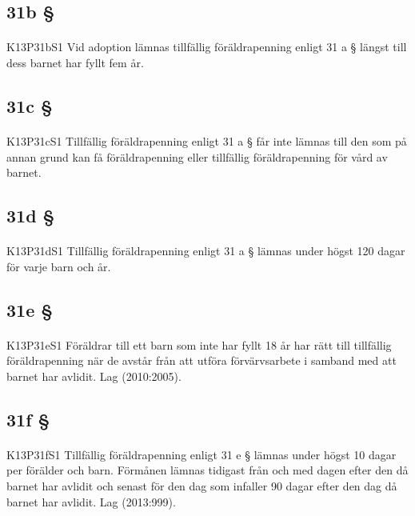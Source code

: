 \documentclass[a4paper,notitlepage,openany,10pt]{book}
\begin{document}
\subsection*{31b §}
\paragraph*{}
{\tiny K13P31bS1}
Vid adoption lämnas tillfällig föräldrapenning enligt 31 a § längst till dess barnet har fyllt fem år.
\subsection*{31c §}
\paragraph*{}
{\tiny K13P31cS1}
Tillfällig föräldrapenning enligt 31 a § får inte lämnas till den som på annan grund kan få föräldrapenning eller tillfällig föräldrapenning för vård av barnet.
\subsection*{31d §}
\paragraph*{}
{\tiny K13P31dS1}
Tillfällig föräldrapenning enligt 31 a § lämnas under högst 120 dagar för varje barn och år.
\subsection*{31e §}
\paragraph*{}
{\tiny K13P31eS1}
Föräldrar till ett barn som inte har fyllt 18 år har rätt till tillfällig föräldrapenning när de avstår från att utföra förvärvsarbete i samband med att barnet har avlidit.
Lag (2010:2005).
\subsection*{31f §}
\paragraph*{}
{\tiny K13P31fS1}
Tillfällig föräldrapenning enligt 31 e § lämnas under högst 10 dagar per förälder och barn. Förmånen lämnas tidigast från och med dagen efter den då barnet har avlidit och senast för den dag som infaller 90 dagar efter den dag då barnet har avlidit.
Lag (2013:999).
\end{document}
